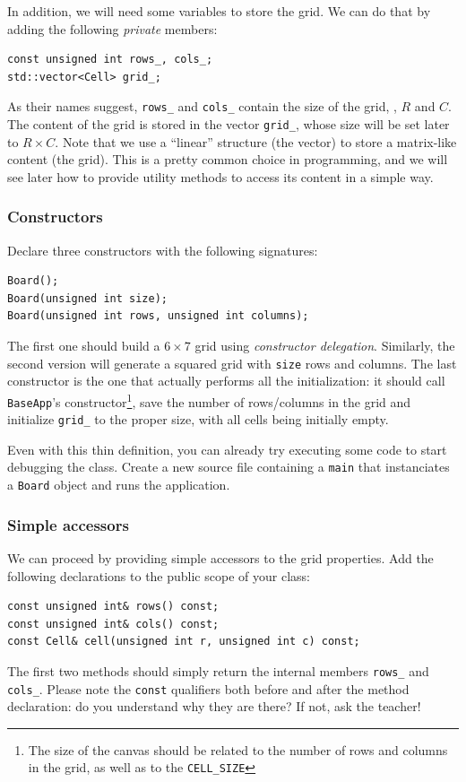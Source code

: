 \documentclass{article}
\begin{document}
In addition, we will need some variables to store the grid. We can do that by adding the following \emph{private} members:
\begin{lstlisting}[style=mycpp,numbers=none]
const unsigned int rows_, cols_;
std::vector<Cell> grid_;
\end{lstlisting}
As their names suggest, \texttt{rows\string_} and \texttt{cols\string_} contain the size of the grid, \ie, $R$ and $C$. The content of the grid is stored in the vector \texttt{grid\string_}, whose size will be set later to $R\times C$. Note that we use a ``linear'' structure (the vector) to store a matrix-like content (the grid). This is a pretty common choice in programming, and we will see later how to provide utility methods to access its content in a simple way.

\subsubsection{Constructors}

Declare three constructors with the following signatures:
\begin{lstlisting}[style=mycpp,numbers=none]
Board();
Board(unsigned int size);
Board(unsigned int rows, unsigned int columns);
\end{lstlisting}
The first one should build a $6\times 7$ grid using \emph{constructor delegation}. Similarly, the second version will generate a squared grid with \texttt{size} rows and columns. The last constructor is the one that actually performs all the initialization: it should call \texttt{BaseApp}'s constructor\footnote{The size of the canvas should be related to the number of rows and columns in the grid, as well as to the \texttt{CELL\string_SIZE}}, save the number of rows/columns in the grid and initialize \texttt{grid\string_} to the proper size, with all cells being initially empty.

Even with this thin definition, you can already try executing some code to start debugging the class. Create a new source file containing a \texttt{main} that instanciates a \texttt{Board} object and runs the application.

\subsubsection{Simple accessors}\label{sec:simple_accessors}

We can proceed by providing simple accessors to the grid properties. Add the following declarations to the public scope of your class:
\begin{lstlisting}[style=mycpp,numbers=none]
const unsigned int& rows() const;
const unsigned int& cols() const;
const Cell& cell(unsigned int r, unsigned int c) const;
\end{lstlisting}
The first two methods should simply return the internal members \texttt{rows\string_} and \texttt{cols\string_}. Please note the \texttt{const} qualifiers both before and after the method declaration: do you understand why they are there? If not, ask the teacher!
\end{document}
